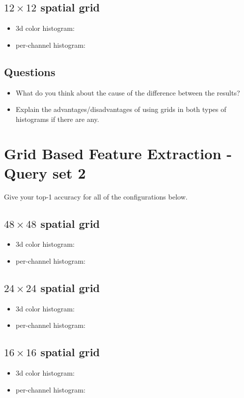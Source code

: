 \documentclass[12pt]{article}
\begin{document}
\subsection{$12\times12$ spatial grid}
\begin{itemize}
\item 3d color histogram:
\item per-channel histogram:
\end{itemize}

\subsection{Questions}
\begin{itemize}
\item What do you think about the cause of the difference between the results?
\item Explain the advantages/disadvantages of using grids in both types of histograms if there are any.
\end{itemize}

\section{Grid Based Feature Extraction - Query set 2}
Give your top-1 accuracy for all of the configurations below.

\subsection{$48\times48$ spatial grid}
\begin{itemize}
\item 3d color histogram:
\item per-channel histogram:
\end{itemize}

\subsection{$24\times24$ spatial grid}
\begin{itemize}
\item 3d color histogram:
\item per-channel histogram:
\end{itemize}

\subsection{$16\times16$ spatial grid}
\begin{itemize}
\item 3d color histogram:
\item per-channel histogram:
\end{itemize}
\end{document}
